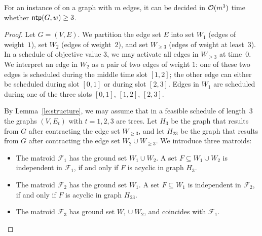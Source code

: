 \begin{theorem}
\label{th:value=3}
For an instance of {\xxxNTP} on a graph with $m$ edges, it can be decided in $\mathcal{O}(m^3)$ time 
whether $\operatorname{\textsf{ntp}}(G,w)\ge3$.
\end{theorem}
\begin{proof}
Let $G=(V,E)$. 
We partition the edge set $E$ into set $W_1$ (edges of weight~$1$), set $W_2$ (edges of weight~$2$),
and set $W_{\ge3}$ (edges of weight at least~$3$).
In a schedule of objective value $3$, we may activate all edges in $W_{\ge3}$ at time~$0$.
We interpret an edge in $W_2$ as a pair of two edges of weight $1$: one of these two edges is scheduled 
during the middle time slot $[1, 2]$; the other edge can either be scheduled during slot $[0,1]$ 
or during slot $[2,3]$. 
Edges in $W_1$ are scheduled during one of the three slots $[0,1]$, $[1,2]$, $[2,3]$.

By Lemma~\ref{le:structure}, we may assume that in a feasible schedule of length~$3$ the 
graphs $(V,E_t)$ with $t=1,2,3$ are trees.
Let $H_3$    be the graph that results from $G$ after contracting the edge set $W_{\ge3}$, and
let $H_{23}$ be the graph that results from $G$ after contracting the edge set $W_2\cup W_{\ge3}$.
We introduce three matroids:
\begin{itemize}
\item The matroid $\mathcal{F}_1$ has the ground set $W_1\cup W_2$. 
A set $F\subseteq W_1\cup W_2$ is independent in $\mathcal{F}_1$, if and only if $F$ is acyclic in graph $H_3$.
\item The matroid $\mathcal{F}_2$ has the ground set $W_1$.
A set $F\subseteq W_1$ is independent in $\mathcal{F}_2$, if and only if $F$ is acyclic in graph $H_{23}$.
\item The matroid $\mathcal{F}_3$ has ground set $W_1\cup W_2$, and coincides with $\mathcal{F}_1$.
\end{itemize}


\end{proof}
